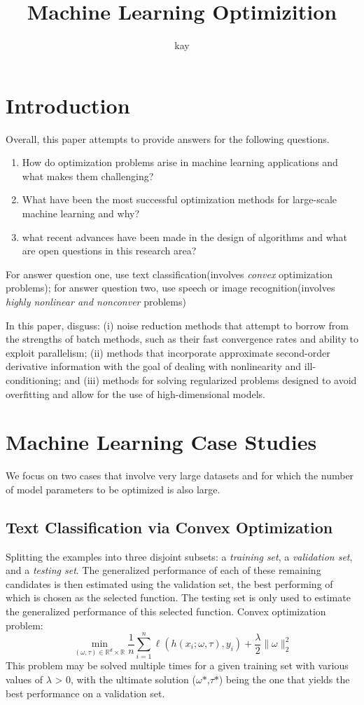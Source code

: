 \documentclass[hyperref, UTF-8]{ctexart}
\author{kay}
\title{Machine Learning Optimizition}
\begin{document}
\maketitle
\tableofcontents
\section{Introduction}
Overall, this paper attempts to provide answers for the following questions.
\begin{enumerate}
\item{How do optimization problems arise in machine learning applications and
    what makes them challenging?}
\item{What have been the most successful optimization methods for large-scale
    machine learning and why?}
\item{what recent advances have been made in the design of algorithms and what
    are open questions in this research area?}
\end{enumerate}
For answer question one, use text classification(involves \emph{convex}
optimization problems); for answer question two, use speech or image
recognition(involves \emph{highly nonlinear and nonconver} problems)

In this paper, disguss: (i) noise reduction methods that attempt to borrow from
the strengths of batch methods, such as their fast convergence rates and ability
to exploit parallelism; (ii) methods that incorporate approximate second-order
derivative information with the goal of dealing with nonlinearity and
ill-conditioning; and (iii) methods for solving regularized problems designed to
avoid overfitting and allow for the use of high-dimensional models.
\section{Machine Learning Case Studies}
We focus on two cases that involve very large datasets and for which the number of model parameters to be optimized is also large. 
\subsection{Text Classification via Convex Optimization}
Splitting the examples into three disjoint subsets: a \emph{training set}, a \emph{validation set}, and a \emph{testing set}. 
The generalized performance of each of these remaining candidates is then estimated using the validation set, the best performing of which is chosen as the selected function. The testing set is only used to estimate the generalized performance of this selected function.
Convex optimization problem:
\begin{equation}
  \min_{(\omega,\tau)\in \mathbb{R}^d\times \mathbb{R}}\frac{1}{n}\sum_{i=1}^{n}\ell(h(x_i;\omega,\tau),y_i) + \frac{\lambda}{2}\parallel\omega\parallel_2^2
\end{equation}
This problem may be solved multiple times for a given training set with various values of $\lambda$ > 0, with the ultimate solution ($\omega${$\ast$},$\tau${$\ast$}) being the one that yields the best performance on a validation set.
\end{document}
